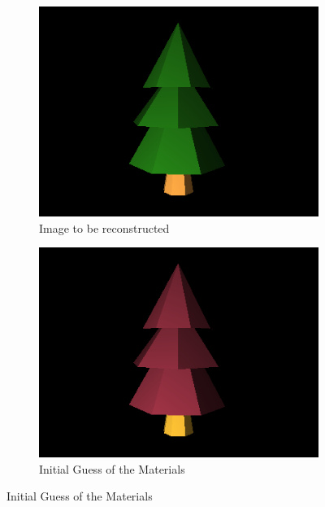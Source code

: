 \documentclass{juliacon}
\begin{document}
\begin{figure}[!htb]
    \centering
    \begin{subfigure}[c]{0.23\textwidth}
        \centering
        \includegraphics[width=\textwidth]{images/material/target.png}
        \caption{Image to be reconstructed}
        \label{fig:target_material}
    \end{subfigure}
    \hfill
    \begin{subfigure}[c]{0.23\textwidth}
        \centering
        \includegraphics[width=\textwidth]{images/material/initial.png}
        \caption{Initial Guess of the Materials}
        \label{fig:guess_material}
    \end{subfigure}
    \centering
    \hfill

\end{figure}
\end{document}
